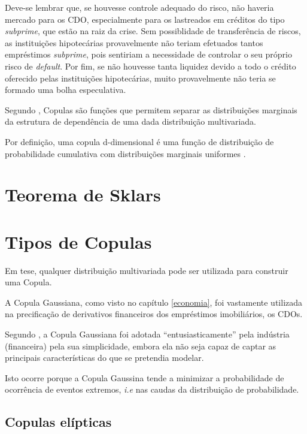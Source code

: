 \documentclass[
	12pt,				%
	oneside,			%
	a4paper,			%
	chapter=TITLE,		%
	section=TITLE,		%
	english,			%
	brazil				%
	]{abntex2}
\begin{document}
Deve-se lembrar que, se houvesse controle adequado do risco, não haveria
mercado para os \gls{CDO}, especialmente para os lastreados em créditos
do tipo \emph{subprime}, que estão na raiz da crise. Sem possiblidade de
transferência de riscos, as instituições hipotecárias provavelmente não
teriam efetuados tantos empréstimos \emph{subprime}, pois sentiriam a
necessidade de controlar o seu próprio risco de \emph{default}. Por fim,
se não houvesse tanta liquidez devido a todo o crédito oferecido pelas
instituições hipotecárias, muito provavelmente não teria se formado uma
bolha especulativa.

Segundo \textcite{copulas}, Copulas são funções que permitem separar as
distribuições marginais da estrutura de dependência de uma dada
distribuição multivariada.

Por definição, uma copula d-dimensional é uma função de distribuição de
probabilidade cumulativa com distribuições marginais uniformes
\autocite[1]{copulas}.

\section{Teorema de Sklars}\label{teorema-de-sklars}

\section{Tipos de Copulas}\label{tipos-de-copulas}

Em tese, qualquer distribuição multivariada pode ser utilizada para
construir uma Copula.

A Copula Gaussiana, como visto no capítulo \ref{economia}, foi
vastamente utilizada na precificação de derivativos financeiros dos
empréstimos imobiliários, os \gls{CDO}s.

Segundo \textcite{devil}, a Copula Gaussiana foi adotada
``entusiasticamente'' pela indústria (financeira) pela sua simplicidade,
embora ela não seja capaz de captar as principais características do que
se pretendia modelar.

Isto ocorre porque a Copula Gaussina tende a minimizar a probabilidade
de ocorrência de eventos extremos, \emph{i.e} nas caudas da distribuição
de probabilidade.

\subsection{Copulas elípticas}\label{copulas-eluxedpticas}
\end{document}
